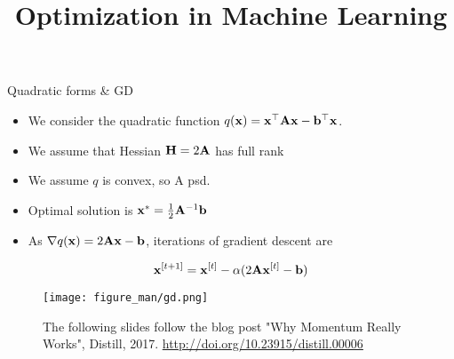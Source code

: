 \documentclass[11pt,compress,t,notes=noshow, xcolor=table]{beamer}
\title{Optimization in Machine Learning}
\begin{document}


\begin{vbframe}{Quadratic forms \& GD}

\begin{itemize}
	\item We consider the quadratic function $q(\mathbf{x}) = \mathbf{x}^\top \mathbf{A} \mathbf{x} - \mathbf{b}^\top \mathbf{x}$. 
    \item We assume that Hessian $\mathbf{H} = 2 \mathbf{A}$ has full rank
\item We assume $q$ is convex, so A psd.
		\item Optimal solution is $\mathbf{x}^\ast = \frac{1}{2} \mathbf{A}^{-1} \mathbf{b}$ 
	\item As $\nabla q(\mathbf{x}) = 2 \mathbf{A} \mathbf{x} - \mathbf{b}$, iterations of gradient descent are
\end{itemize}

\vspace{-0.5\baselineskip}

\begin{equation*}
    \mathbf{x}^{[t+1]} = \mathbf{x}^{[t]} - \alpha (2 \mathbf{A} \mathbf{x}^{[t]} - \mathbf{b})
\end{equation*}

\vspace{-\baselineskip}

\begin{figure}
	\texttt{[image: figure\_man/gd.png]}
    \caption*{\centering \footnotesize
        The following slides follow the blog post "Why Momentum Really Works", Distill, 2017.
        \url{http://doi.org/10.23915/distill.00006}}
\end{figure}

\end{vbframe}
\end{document}
